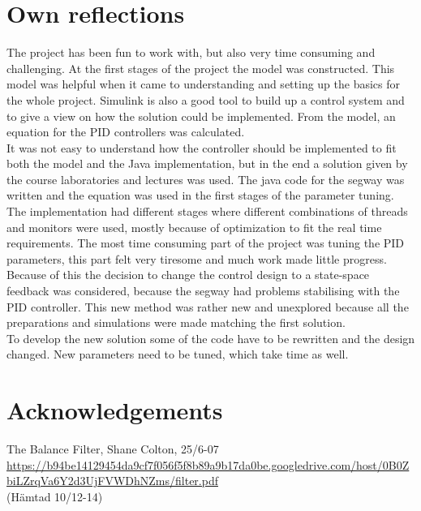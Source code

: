 \documentclass[a4paper]{article}
\begin{document}
\section{Own reflections}
The project has been fun to work with, but also very time consuming and challenging. At the first stages of the project the model was constructed. This model was helpful when it came to understanding and setting up the basics for the whole project. Simulink is also a good tool to build up a control system and to give a view on how the solution could be implemented. From the model, an equation for the PID controllers was calculated. \\

It was not easy to understand how the controller should be implemented to fit both the model and the Java implementation, but in the end a solution given by the course laboratories and lectures was used. The java code for the segway was written and the equation was used in the first stages of the parameter tuning. The implementation had different stages where different combinations of threads and monitors were used, mostly because of optimization to fit the real time requirements. The most time consuming part of the project was tuning the PID parameters, this part felt very tiresome and much work made little progress. Because of this the decision to change the control design to a state-space feedback was considered, because the segway had problems stabilising with the PID controller. This new method was rather new and unexplored because all the preparations and simulations were made matching the first solution. \\

To develop the new solution some of the code have to be rewritten and the design changed. New parameters need to be tuned, which take time as well. \\


\section{Acknowledgements}

\begin{thebibliography}{1}
The Balance Filter, Shane Colton, 25/6-07\\
\url{https://b94be14129454da9cf7f056f5f8b89a9b17da0be.googledrive.com/host/0B0ZbiLZrqVa6Y2d3UjFVWDhNZms/filter.pdf}\\
(Hämtad 10/12-14)
\end{thebibliography}
\end{document}
